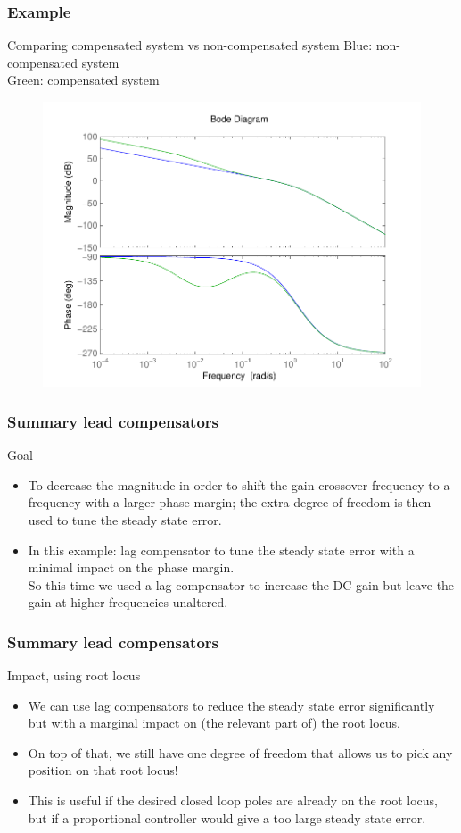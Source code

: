 \begin{frame}
\frametitle{Example}
\begin{block}{Comparing compensated system vs non-compensated system}
Blue: non-compensated system \\
Green: compensated system
\begin{figure}
	\centering
	\includegraphics[width=0.5
	\linewidth]{bodeexamplelagcomparing}
\end{figure}
\end{block}
\end{frame}

\begin{frame}
\frametitle{Summary lead compensators}
\begin{block}{Goal}
	\begin{itemize}
\item To decrease the magnitude in order to shift the gain crossover frequency to a frequency with a larger phase margin; the extra degree of freedom is then used to tune the steady state error.
\item In this example: lag compensator to tune the steady state error with a minimal impact on the phase margin. \\
So this time we used a lag compensator to increase the DC gain but leave the gain at higher frequencies unaltered.
\end{itemize}
\end{block}
\end{frame}

\begin{frame}
\frametitle{Summary lead compensators}
\begin{block}{Impact, using root locus}
\begin{itemize}
\item We can use lag compensators to reduce the steady state error significantly but with a marginal impact on (the relevant part of) the root locus.
\item On top of that, we still have one degree of freedom that allows us to pick any position on that root locus!
\item This is useful if the desired closed loop poles are already on the root locus, but if a proportional controller would give a too large steady state error.
\end{itemize}
\end{block}
\end{frame}

